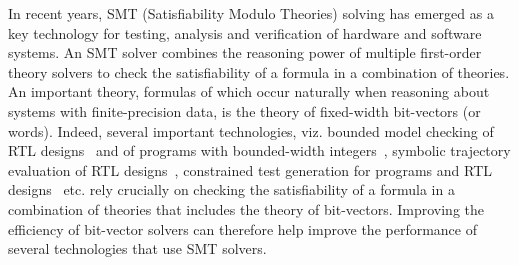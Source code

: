 %
In recent years, SMT (Satisfiability Modulo Theories) solving has
emerged as a key technology for testing, analysis and verification of
hardware and software systems.  An SMT solver combines the reasoning
power of multiple first-order theory solvers to check the
satisfiability of a formula in a combination of theories.
An important theory, formulas of which occur naturally when reasoning
about systems with finite-precision data, is the theory of fixed-width
bit-vectors (or words).  Indeed, several important technologies,
viz. bounded model checking of RTL
designs~\cite{hwcbmc,boolector,ebmc} and of programs with
bounded-width integers~\cite{cbmc,corral,boogie}, symbolic trajectory
evaluation of RTL designs~\cite{wste}, constrained test generation for
programs and RTL designs~\cite{crv,concolic,dart} etc. rely crucially
on checking the satisfiability of a formula in a combination of
theories that includes the theory of bit-vectors.  Improving the
efficiency of bit-vector solvers can therefore help improve the
performance of several technologies that use SMT solvers.

